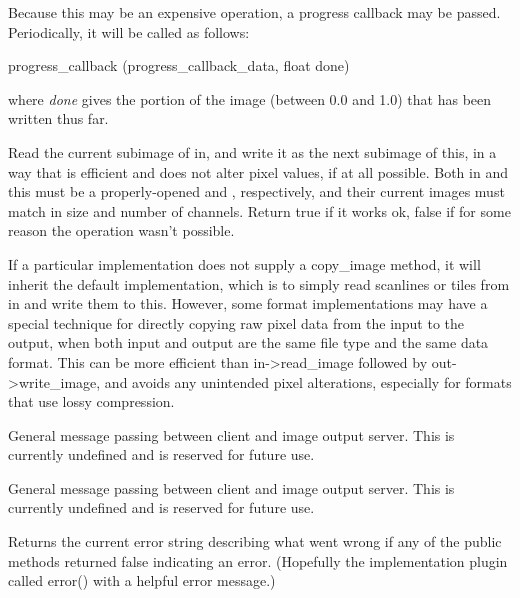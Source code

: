 Because this may be an expensive operation, a progress callback may be passed.
Periodically, it will be called as follows:
\begin{code}
        progress_callback (progress_callback_data, float done)
\end{code}
\noindent where \emph{done} gives the portion of the image 
(between 0.0 and 1.0) that has been written thus far.

\apiend


Read the current subimage of {\cf in}, and write it as the next subimage
of {\cf *this}, in a way that is efficient and does not alter pixel
values, if at all possible.  Both {\cf in} and {\cf this} must be a
properly-opened \ImageInput and \ImageOutput, respectively, and their
current images must match in size and number of channels.  Return {\cf true}
if it works ok, {\cf false} if for some reason the operation wasn't possible.

If a particular \ImageOutput implementation does not supply a
{\cf copy_image} method, it will inherit the default implementation,
which is to simply read scanlines or tiles from {\cf in} and write
them to {\cf *this}.  However, some format implementations may have a
special technique for directly copying raw pixel data from the
input to the output, when both input and output are the same
file type and the same data format.  This can be more efficient 
than {\cf in->read_image} followed by {\cf out->write_image}, and avoids any
unintended pixel alterations, especially for formats that use
lossy compression.
\apiend

General message passing between client and image output server.
This is currently undefined and is reserved for future use.
\apiend

General message passing between client and image output server.
This is currently undefined and is reserved for future use.
\apiend

Returns the current error string describing what went wrong if
any of the public methods returned {\kw false} indicating an error.
(Hopefully the implementation plugin called {\kw error()} with a
helpful error message.)
\apiend




\chapwidthend
